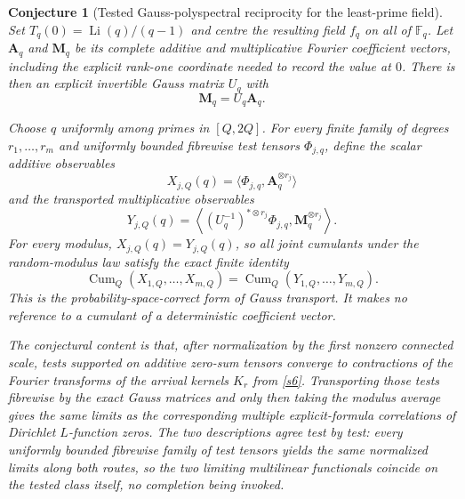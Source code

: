 \documentclass[11pt]{article}
\newtheorem{conjecture}{Conjecture}
\theoremstyle{definition}
\newcommand{\Li}{\operatorname{Li}}
\newcommand{\Fq}{\mathbb F}
\begin{document}
\begin{conjecture}[Tested Gauss-polyspectral reciprocity for the least-prime field]\label{s7}
Set $T_q(0)=\Li(q)/(q-1)$ and centre the resulting field $f_q$ on all of $\Fq_q$.
Let $\mathbf A_q$ and $\mathbf M_q$ be its complete additive and multiplicative Fourier
coefficient vectors, including the explicit rank-one coordinate needed to record the
value at $0$.  There is then an explicit invertible Gauss matrix $U_q$ with
\[
 \mathbf M_q=U_q\mathbf A_q.
\]

Choose $q$ uniformly among primes in $[Q,2Q]$.  For every finite family of degrees
$r_1,\ldots,r_m$ and uniformly bounded fibrewise test tensors
$\Phi_{j,q}$, define the scalar additive observables
\[
 X_{j,Q}(q)=\langle\Phi_{j,q},\mathbf A_q^{\otimes r_j}\rangle
\]
and the transported multiplicative observables
\[
 Y_{j,Q}(q)=
 \left\langle (U_q^{-1})^{*\otimes r_j}\Phi_{j,q},
               \mathbf M_q^{\otimes r_j}\right\rangle.
\]
For every modulus, $X_{j,Q}(q)=Y_{j,Q}(q)$, so all joint cumulants under the
random-modulus law satisfy the exact finite identity
\[
 \operatorname{Cum}_Q(X_{1,Q},\ldots,X_{m,Q})
 =\operatorname{Cum}_Q(Y_{1,Q},\ldots,Y_{m,Q}).
\]
This is the probability-space-correct form of Gauss transport.  It makes no reference to
a cumulant of a deterministic coefficient vector.

The conjectural content is that, after normalization by the first nonzero connected
scale, tests supported on additive zero-sum tensors converge to contractions of the
Fourier transforms of the arrival kernels $K_r$ from \cref{s6}.  Transporting those
tests fibrewise by the exact Gauss matrices and only then taking the modulus average
gives the same limits as the corresponding multiple explicit-formula correlations of
Dirichlet $L$-function zeros.  The two descriptions agree test by test: every uniformly bounded
fibrewise family of test tensors yields the same normalized limits
along both routes, so the two limiting multilinear functionals
coincide on the tested class itself, no completion being invoked.
\end{conjecture}
\end{document}
